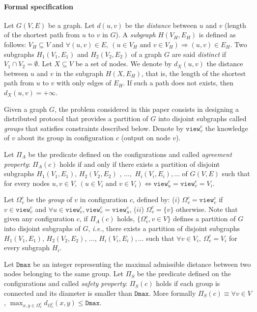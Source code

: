 \documentclass[11pt,english]{article}
\begin{document}
\paragraph{Formal specification}
Let $G(V,E)$ be a graph.  Let $d(u,v)$ be the \emph{distance} between $u$ and
$v$ (length of the shortest path from $u$ to $v$ in $G$).
A \emph{subgraph} $H(V_H,E_H)$ is defined as follows: $V_H \subseteq V$ and
$\forall (u,v) \in E,\ (u \in V_H \mbox{ and } v \in V_H) \Rightarrow (u,v) \in
E_H$.
Two subgraphs $H_1(V_1,E_1)$ and $H_2(V_2,E_2)$ of a graph $G$ are said
\emph{distinct} if $V_1 \cap V_2 = \emptyset$.
Let $X \subseteq V$ be a set of nodes. We denote by $d_X(u,v)$ the distance
between $u$ and $v$ in the subgraph $H(X,E_H)$, that is, the length of the
shortest path from $u$ to $v$ with only edges of $E_H$. If such a path does not
exists, then $d_X(u,v) = +\infty$.

Given a graph $G$, the problem considered in this paper consists in designing a
distributed protocol that provides a partition of $G$ into disjoint subgraphs
called {\em groups} that satisfies constraints described
below.  Denote by $\texttt{view}_v^c$ the knowledge of $v$ about its group in
configuration $c$ (output on node $v$).

Let $\Pi_A$ be the predicate defined on the configurations and called
\emph{agreement property}: $\Pi_A(c)$ holds if and only if there exists a
partition of disjoint subgraphs $H_1(V_1,E_1)$, $H_2(V_2,E_2)$ , $\ldots,$
$H_i(V_i,E_i), \ldots$ of $G(V,E)$ such that for every nodes $u,v \in V$, $(u \in V_i
\mbox{ and } v \in V_i) \Leftrightarrow \texttt{view}_u^c = \texttt{view}_v^c =
V_i$.


Let $\Omega_v^c$ be the \emph{group} of $v$ in configuration $c$, defined by:
($i$) $\Omega_v^c = \texttt{view}_v^c$ if $v \in \texttt{view}_v^c$ and $\forall u
\in \texttt{view}_v^c, \texttt{view}_v^c = \texttt{view}_u^c$, ($ii$) $\Omega_v^c
= \{v\}$ otherwise.  Note that given any configuration $c$, if $\Pi_A(c)$ holds,
$\{ \Omega_v^c, v \in V\}$ defines a partition of $G$ into disjoint subgraphs of
$G$, {\it i.e.}, there exists a partition of disjoint subgraphs $H_1(V_1,E_1)$,
$H_2(V_2,E_2)$, $\ldots$, $H_i(V_i,E_i), \ldots$ such that $\forall v \in V_i,\
\Omega_v^c = V_i$ for every subgraph $H_i$. 

Let $\texttt{Dmax}$ be an integer representing the maximal admissible distance between two nodes belonging to
the same group.  Let $\Pi_S$ be the predicate defined on the configurations and called \emph{safety
property}: $\Pi_S(c)$ holds if each group is connected and its diameter is
smaller than $\texttt{Dmax}$.
More formally $\Pi_S(c) \equiv \forall v \in V$, $\max_{x,y \in \Omega_v^c}
d_{\Omega_v^c}(x,y) \leq \texttt{Dmax}$.
\end{document}
